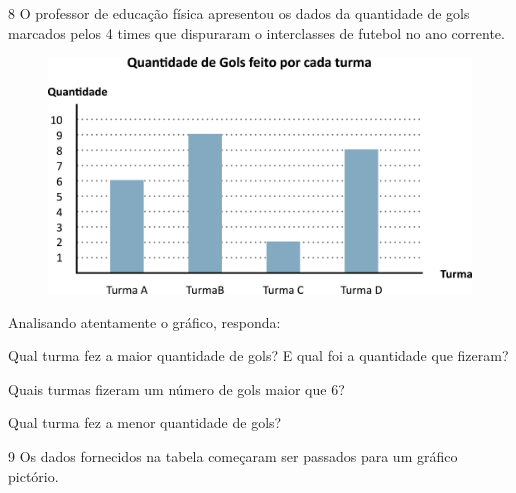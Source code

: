 \num{8} O professor de educação física apresentou os dados da quantidade de gols
marcados pelos 4 times que dispuraram o interclasses de futebol no ano
corrente.

\begin{figure}[htpb!]
\centering
\includegraphics[width=.8\textwidth]{./media/image83.png}
\end{figure}

Analisando atentamente o gráfico, responda:

\begin{escolha}
\item Qual turma fez a maior quantidade de gols? E qual foi a quantidade que fizeram?

\item Quais turmas fizeram um número de gols maior que 6?

\item Qual turma fez a menor quantidade de gols?
\end{escolha}

\pagebreak
\num{9} Os dados fornecidos na tabela começaram ser passados para um
gráfico pictório.

